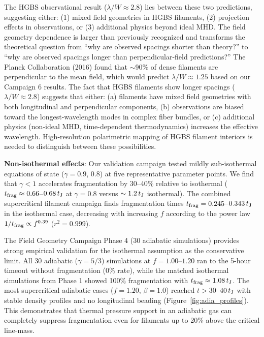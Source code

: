 \documentclass[twoside,twocolumn]{mnras}
\begin{document}
The HGBS observational result ($\lambda/W \approx 2.8$) lies between these two predictions, suggesting either: (1) mixed field geometries in HGBS filaments, (2) projection effects in observations, or (3) additional physics beyond ideal MHD. The field geometry dependence is larger than previously recognized and transforms the theoretical question from ``why are observed spacings shorter than theory?'' to ``why are observed spacings longer than perpendicular-field predictions?'' The Planck Collaboration (2016) found that $\sim$90\% of dense filaments are perpendicular to the mean field, which would predict $\lambda/W \approx 1.25$ based on our Campaign 6 results. The fact that HGBS filaments show longer spacings ($\lambda/W \approx 2.8$) suggests that either: (a) filaments have mixed field geometries with both longitudinal and perpendicular components, (b) observations are biased toward the longest-wavelength modes in complex fiber bundles, or (c) additional physics (non-ideal MHD, time-dependent thermodynamics) increases the effective wavelength. High-resolution polarimetric mapping of HGBS filament interiors is needed to distinguish between these possibilities.

\textbf{Non-isothermal effects}: Our validation campaign tested mildly sub-isothermal equations of state ($\gamma = 0.9$, $0.8$) at five representative parameter points. We find that $\gamma < 1$ accelerates fragmentation by 30--40\% relative to isothermal ($t_{\rm frag} \approx 0.66$--$0.68\,t_{\rm J}$ at $\gamma = 0.8$ versus $\sim 1.2\,t_{\rm J}$ isothermal). The combined supercritical filament campaign finds fragmentation times $t_{\rm frag} = 0.245$--$0.343\,t_{\rm J}$ in the isothermal case, decreasing with increasing $f$ according to the power law $1/t_{\rm frag} \propto f^{0.39}$ ($r^2 = 0.999$).

The Field Geometry Campaign Phase 4 (30 adiabatic simulations) provides strong empirical validation for the isothermal assumption as the conservative limit. All 30 adiabatic ($\gamma = 5/3$) simulations at $f = 1.00$--$1.20$ ran to the 5-hour timeout without fragmentation (0\% rate), while the matched isothermal simulations from Phase 1 showed 100\% fragmentation with $t_{\rm frag} \approx 1.08\,t_{\rm J}$. The most supercritical adiabatic cases ($f = 1.20$, $\beta = 1.0$) reached $t > 30$--$40\,t_{\rm J}$ with stable density profiles and no longitudinal beading (Figure~\ref{fig:adia_profiles}). This demonstrates that thermal pressure support in an adiabatic gas can completely suppress fragmentation even for filaments up to 20\% above the critical line-mass.
\end{document}
